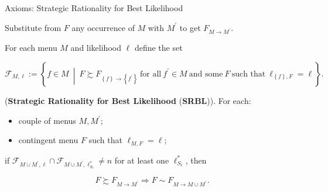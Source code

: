 \documentclass[usenames,dvipsnames,aspectratio=169,11pt, handout]{beamer}
\begin{document}
\begin{frame}{Axioms: Strategic Rationality for Best Likelihood}\label{srblapp}

	Substitute from \( F \) any occurrence of \( M \) with \( M^{\prime} \) to get \( F_{M \rightarrow M^{\prime}} \).

	\vfill

	For each menu \( M \) and likelihood \( \ell \) define the set

	\[
		\mathcal{F}_{M, \ell} := \left\{ f \in M \: \middle\vert \: F \succsim F_{\left\{ f \right\} \rightarrow \left\{ f^{\prime} \right\}} \: \text{for all} \: f^{\prime} \in M \: \text{and some} \: F \: \text{such that} \: \ell_{\left\{ f \right\}, F} = \ell \right\} .
	\]

	\begin{axiom}\label{ax:appsrbl}

		(\textbf{Strategic Rationality for Best Likelihood} (\textbf{SRBL})). For each:
		\begin{itemize}
			\item couple of menus \( M, M^{\prime} \);
			\item contingent menu \( F \) such that \( \ell_{M,F} = \ell \);
		\end{itemize}
		if \( \mathcal{F}_{M \cup M^{\prime}, \ell} \cap \mathcal{F}_{M \cup M^{\prime}, \ell^{*}_{S_{\ell}}} \neq n \) for at least one \( \ell_{S_{\ell}}^{*} \), then

		\[
			F \succsim F_{M \rightarrow M^{\prime}} \Rightarrow F \sim F_{M \rightarrow M \cup M^{\prime}} .
		\]

	\end{axiom}

	\begin{flushright}
		\hyperlink{srbl}{}
	\end{flushright}


\end{frame}
\end{document}
